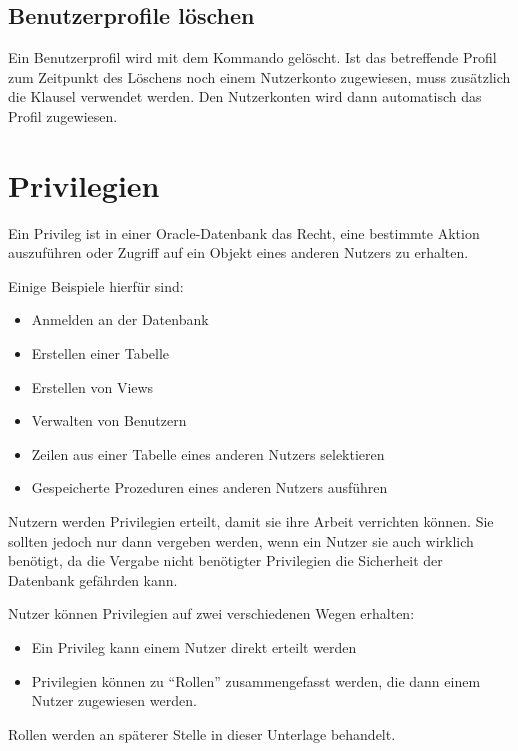       \subsection{Benutzerprofile löschen}
        Ein Benutzerprofil wird mit dem Kommando  gelöscht. Ist das betreffende Profil zum Zeitpunkt des Löschens noch einem Nutzerkonto zugewiesen, muss zusätzlich die Klausel  verwendet werden. Den Nutzerkonten wird dann automatisch das Profil  zugewiesen.
        \begin{literaturinternet}
          \item \cite{i1006575}
        \end{literaturinternet}
    \section{Privilegien}
      \begin{merke}
        Ein Privileg ist in einer Oracle-Datenbank das Recht, eine bestimmte
        Aktion auszuführen oder Zugriff auf ein Objekt eines anderen
        Nutzers zu erhalten.
      \end{merke}
      Einige Beispiele hierfür sind:
      \begin{itemize}
        \item Anmelden an der Datenbank
        \item Erstellen einer Tabelle
        \item Erstellen von Views
        \item Verwalten von Benutzern
        \item Zeilen aus einer Tabelle eines anderen Nutzers selektieren
        \item Gespeicherte Prozeduren eines anderen Nutzers ausführen
      \end{itemize}
      Nutzern werden  Privilegien erteilt, damit sie ihre Arbeit verrichten
      können. Sie sollten jedoch nur dann vergeben werden, wenn ein Nutzer sie
      auch wirklich benötigt, da die Vergabe nicht benötigter Privilegien
      die Sicherheit der Datenbank gefährden kann.
      
      Nutzer können Privilegien auf zwei verschiedenen Wegen erhalten:
      \begin{itemize}
        \item Ein Privileg kann einem Nutzer direkt erteilt werden
        \item Privilegien können zu \enquote{Rollen} zusammengefasst werden, die dann einem Nutzer zugewiesen werden.
      \end{itemize}
      Rollen werden an späterer Stelle in dieser Unterlage behandelt.
